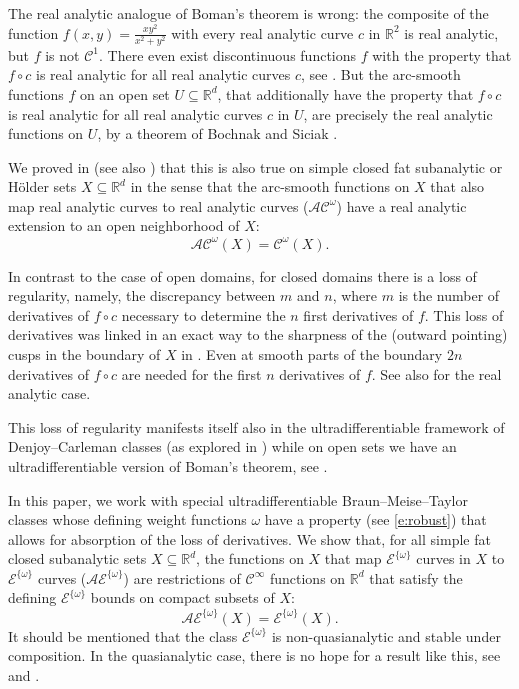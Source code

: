 \documentclass[10pt, reqno]{amsart}
\theoremstyle{plain}
\theoremstyle{definition}
\numberwithin{equation}{section}
\def\om{\omega}
\def\R{\mathbb{R}}
\def\cC{\mathcal{C}}
\def\cE{\mathcal{E}}
\renewcommand{\o}{\circ}
\def\AA{\mathcal{AC}^\omega}
\def\AU{\mathcal{AE}^{\{\omega\}}}
\begin{document}
The real analytic analogue of Boman's theorem is wrong: the composite of the function $f(x,y) = \frac{xy^2}{x^2+y^2}$  
with every real analytic curve $c$ in $\R^2$ is real analytic, but $f$ is not $\cC^1$. 
There even exist discontinuous functions $f$ 
with the property that $f\o c$ is real analytic for all real analytic curves $c$, see
\cite{BierstoneMilmanParusinski91}. 
But the arc-smooth functions $f$ on an open set $U \subseteq \R^d$, that additionally 
have the property that $f\o c$ is real analytic for all real analytic curves $c$ in $U$,    
are precisely the real analytic functions on $U$, by a theorem of Bochnak and Siciak \cite{Siciak70, BochnakSiciak71}.

We proved in \cite{Rainer18} (see also \cite{Rainer:2024aa}) that this is also true on simple closed fat subanalytic or H\"older sets $X \subseteq \R^d$
in the sense that the arc-smooth functions on $X$ that also map real analytic curves to real analytic curves ($\AA$) have a real analytic extension to an open neighborhood of $X$:
\begin{equation} \label{e:AA}
    \AA(X) = \cC^\om(X).
\end{equation}

In contrast to the case of open domains,
for closed domains there is a loss of regularity, namely, 
the discrepancy between $m$ and $n$, where $m$ is
the number of derivatives of $f \o c$ necessary to determine the $n$ first derivatives of $f$.
This loss of derivatives 
was linked in an exact way to the sharpness of the (outward pointing) cusps in the boundary of $X$ in \cite{Rainer:2021tr}.
Even at smooth parts of the boundary $2n$ derivatives of $f \o c$ are needed for the first $n$ derivatives of $f$.
See also \cite{Rainer:2024aa} for the real analytic case.



This loss of regularity manifests itself also in the ultradifferentiable framework of Denjoy--Carleman classes (as explored in \cite{Rainer18}) 
while on open sets we have an ultradifferentiable version of Boman's theorem, see \cite{KMRc}.  

In this paper, we work with special ultradifferentiable Braun--Meise--Taylor classes whose defining weight functions $\om$ 
have a property (see \eqref{e:robust})
that allows for absorption of the loss of derivatives.
We show that, for all simple fat closed subanalytic sets $X \subseteq \R^d$, 
the functions on $X$ that map $\cE^{\{\om\}}$ curves in $X$ to $\cE^{\{\om\}}$ curves ($\AU$) are restrictions of $\cC^\infty$ functions on $\R^d$ that satisfy the defining $\cE^{\{\om\}}$ bounds 
on compact subsets of $X$:
\begin{equation} \label{e:AU}
    \AU(X) = \cE^{\{\om\}}(X).
\end{equation}
It should be mentioned that the class $\cE^{\{\om\}}$ is non-quasianalytic and stable under composition. 
In the quasianalytic case, there is no hope for a result like this, 
see \cite{Jaffe16} and \cite{Rainer:2019aa}.
\end{document}
